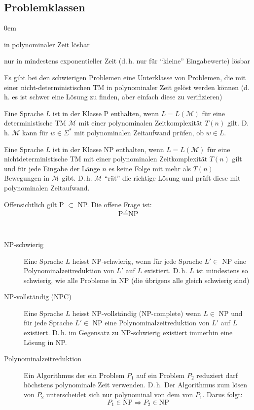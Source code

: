 \subsection{Problemklassen}
\begin{description}\itemsep0em
	\item [Einfaches Problem] 
	in polynominaler Zeit lösbar
	
	\item [Schwieriges Problem] 
	nur in mindestens exponentieller Zeit (d.\,h. nur für \enquote{kleine} Eingabewerte) lösbar
	
	Es gibt bei den schwierigen Problemen eine Unterklasse von Problemen, die mit einer nicht-deterministischen TM in polynominaler Zeit gelöst werden können (d.\,h. es ist schwer eine Lösung zu finden, aber einfach diese zu verifizieren)

	\item [P]
	Eine Sprache $L$ ist in der Klasse P enthalten, wenn $L = L(\mathcal{M})$ für eine deterministische TM $\mathcal{M}$ mit einer polynominalen Zeitkomplexität $T(n)$ gilt. D.\,h. $\mathcal{M}$ kann für $w \in \Sigma^*$ mit polynominalen Zeitaufwand prüfen, ob $w \in L$.

	\item [NP]
	Eine Sprache $L$ ist in der Klasse NP enthalten, wenn $L = L(\mathcal{M})$ für eine nichtdeterministische TM mit einer polynominalen Zeitkomplexität $T(n)$ gilt und für jede Eingabe der Länge $n$ es keine Folge mit mehr als $T(n)$ Bewegungen in $\mathcal{M}$ gibt. D.\,h. $\mathcal{M}$ \enquote{rät} die richtige Lösung und prüft diese mit polynominalen Zeitaufwand.

	Offensichtlich gilt P $\subset$ NP. Die offene Frage ist: 
	\begin{equation*}
	\mbox{P} \overset{?}{=} \mbox{NP}
	\end{equation*}
\end{description}
~\\\vfill
\begin{description}
	\item [NP-schwierig] 
	Eine Sprache $L$ heisst NP-schwierig, wenn für jede Sprache $L' \in$ NP eine Polynominalzeitreduktion von $L'$ auf $L$ existiert. D.\,h. $L$ ist mindestens so schwierig, wie alle Probleme in NP (die übrigens alle gleich schwierig sind)

	\item[NP-vollständig (NPC)]
	Eine Sprache $L$ heisst NP-vollständig (NP-complete) wenn $L \in $ NP und für jede Sprache $L' \in $ NP eine Polynominalzeitreduktion von $L'$ auf $L$ existiert. D.\,h. im Gegensatz zu NP-schwierig existiert immerhin eine Lösung in NP.

	\item[Polynominalzeitreduktion]
	Ein Algorithmus der ein Problem $P_1$ auf ein Problem $P_2$ reduziert darf höchstens polynominale Zeit verwenden. D.\,h. Der Algorithmus zum lösen von $P_2$ unterscheidet sich nur polynominal von dem von $P_1$. Darus folgt:
	\begin{equation*}
		P_1 \in \mbox{NP} \Rightarrow P_2 \in \mbox{NP}
	\end{equation*} 
\end{description}

